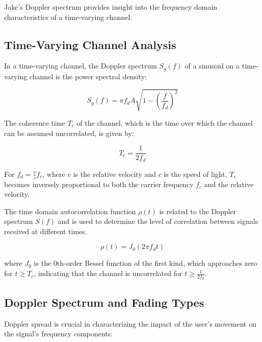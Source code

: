 Jake's Doppler spectrum provides insight into the frequency domain characteristics of a time-varying channel.

\subsection*{Time-Varying Channel Analysis}

In a time-varying channel, the Doppler spectrum \( S_{g}(f) \) of a sinusoid on a time-varying channel is the power spectral density:

\begin{equation}
    S_{g}(f) = \pi f_d A \sqrt{1 - (\frac{f}{f_d})^2}
\end{equation}

The coherence time \( T_c \) of the channel, which is the time over which the channel can be assumed uncorrelated, is given by:

\begin{equation}
    T_c = \frac{1}{2 f_d}
\end{equation}

For \( f_d = \frac{v}{c}f_c \), where \( v \) is the relative velocity and \( c \) is the speed of light, \( T_c \) becomes inversely proportional to both the carrier frequency \( f_c \) and the relative velocity.

The time domain autocorrelation function \( \rho(t) \) is related to the Doppler spectrum \( S(f) \) and is used to determine the level of correlation between signals received at different times.

\begin{equation}
    \rho(t) = J_0(2\pi f_d t)
\end{equation}

where \( J_0 \) is the 0th-order Bessel function of the first kind, which approaches zero for \( t \geq T_c \), indicating that the channel is uncorrelated for \( t \geq \frac{1}{2 f_d} \).





\subsection*{Doppler Spectrum and Fading Types}

Doppler spread is crucial in characterizing the impact of the user's movement on the signal's frequency components:

